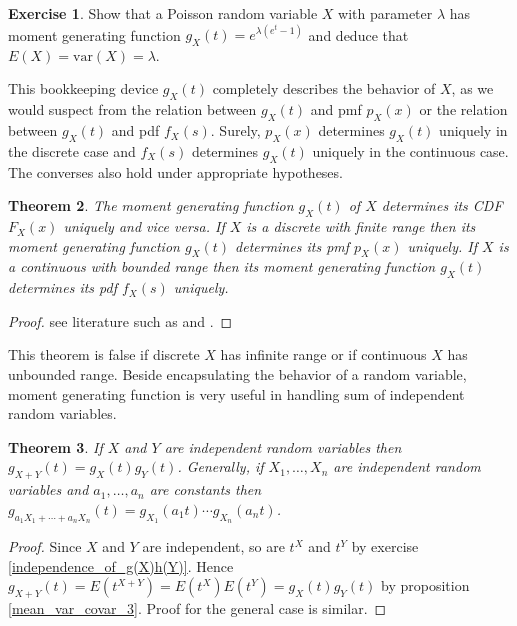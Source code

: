 \documentclass[12pt]{amsart}
\newtheorem{theorem}{Theorem}[section]
\theoremstyle{definition}
\newtheorem{exercise}[theorem]{Exercise}
\begin{document}
\begin{exercise} Show that a Poisson random variable $X$ with parameter $\lambda$ has moment generating function $g_X(t) = e^{\lambda(e^t-1)}$ and deduce that $E(X) = \text{var}(X) = \lambda$.
\end{exercise}

This bookkeeping device $g_X(t)$ completely describes the behavior of $X$, as we would suspect from the relation between $g_X(t)$ and pmf $p_X(x)$ or the relation between $g_X(t)$ and pdf $f_X(s)$. Surely, $p_X(x)$ determines $g_X(t)$ uniquely in the discrete case and $f_X(s)$ determines $g_X(t)$ uniquely in the continuous case. The converses also hold under appropriate hypotheses.

\begin{theorem} \label{generating_function_pdf} The moment generating function $g_X(t)$ of $X$ determines its CDF $F_X(x)$ uniquely and vice versa. If $X$ is a discrete with finite range then its moment generating function $g_X(t)$ determines its pmf $p_X(x)$ uniquely. If $X$ is a continuous with bounded range then its moment generating function $g_X(t)$ determines its pdf $f_X(s)$ uniquely.
\end{theorem}
\begin{proof} see literature such as \cite[10.2]{GrinsteadSnellItoP} and \cite[10.5]{GrinsteadSnellItoP}.
\end{proof}

This theorem is false if discrete $X$ has infinite range or if continuous $X$ has unbounded range. Beside encapsulating the behavior of a random variable, moment generating function is very useful in handling sum of independent random variables.

\begin{theorem} \label{generating_function_of_sum} If $X$ and $Y$ are independent random variables then $g_{X+Y}(t) = g_X(t)g_Y(t)$. Generally, if $X_1, \dots , X_n$ are independent random variables and $a_1, \dots ,a_n$ are constants then $g_{a_1X_1 + \cdots + a_nX_n}(t) = g_{X_1}(a_1t) \cdots g_{X_n}(a_n t)$.
\end{theorem}
\begin{proof} Since $X$ and $Y$ are independent, so are $t^X$ and $t^Y$ by exercise \ref{independence_of_g(X)h(Y)}. Hence $g_{X+Y}(t) = E(t^{X+Y}) = E(t^X)E(t^Y) = g_X(t)g_Y(t)$ by proposition \ref{mean_var_covar_3}. Proof for the general case is similar.
\end{proof}
\end{document}
